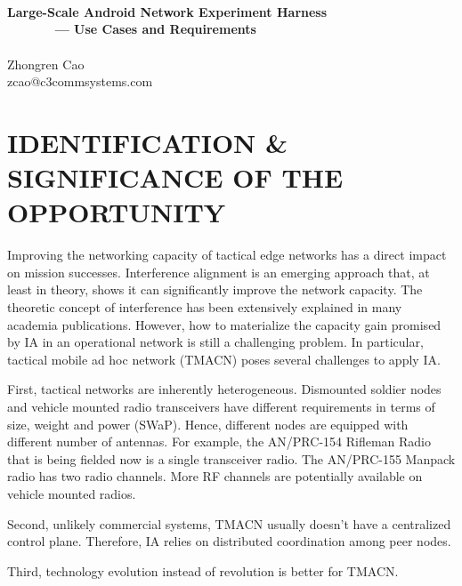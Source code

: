 \documentclass[letterpaper,11pt,onecolumn]{article}
\begin{document}

\thispagestyle{fancy}

\begin{center}
~\\
~\\
~\\
{\Large{\bf{Large-Scale Android Network Experiment Harness\\
~~~~~~ --- Use Cases and Requirements}}}\\
~\\
\vspace{0.1in}
Zhongren Cao\\
zcao@c3commsystems.com
\end{center}

\vspace{0.1in}

\section{IDENTIFICATION \& SIGNIFICANCE OF THE OPPORTUNITY}


Improving the networking capacity of tactical edge networks has a direct impact on mission successes. Interference alignment is an emerging approach that, at least in theory, shows it can significantly improve the network capacity. The theoretic concept of interference has been extensively explained in many academia publications. However, how to materialize the capacity gain promised by IA in an operational network is still a challenging problem. In particular, tactical mobile ad hoc network (TMACN) poses several challenges to apply IA. 

First, tactical networks are inherently heterogeneous. Dismounted soldier nodes and vehicle mounted radio transceivers have different requirements in terms of size, weight and power (SWaP). Hence, different nodes are equipped with different number of antennas. For example, the AN/PRC-154 Rifleman Radio that is being fielded now is a single transceiver radio. The AN/PRC-155 Manpack radio has two radio channels. More RF channels are potentially  available on vehicle mounted radios. 

Second, unlikely commercial systems, TMACN usually doesn't have a centralized control plane. Therefore, IA relies on distributed coordination among peer nodes. 

Third,  technology evolution instead of revolution is better for TMACN.
\end{document}
